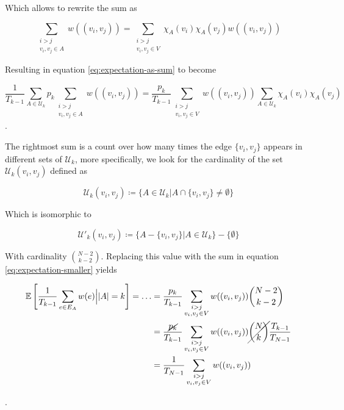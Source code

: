 \documentclass[a4paper, 10pt]{article}
\begin{document}
Which allows to rewrite the sum as

\begin{equation}
    \sum_{\substack{i>j \\ v_i,v_j \in A}}w((v_i,v_j)) = \sum_{\substack{i>j \\ v_i,v_j \in V}}\chi_A(v_i)\chi_A(v_j)w((v_i,v_j))
\end{equation}

Resulting in equation \ref{eq:expectation-as-sum} to become

\begin{equation}
    \frac{1}{T_{k-1}}\sum_{A \in \mathcal{U}_k} p_k \sum_{\substack{i>j \\ v_i,v_j \in A}}w((v_i,v_j)) = \frac{p_k}{T_{k-1}}\sum_{\substack{i>j \\ v_i,v_j \in V}}w((v_i,v_j))\sum_{A \in \mathcal{U}_k}\chi_A(v_i)\chi_A(v_j)
    \label{eq:expectation-smaller}
\end{equation}
.

The rightmost sum is a count over how many times the edge $\{v_i,v_j\}$ appears in different sets of $\mathcal{U}_k$, more specifically, we look for the cardinality of the set $\mathcal{U}_k(v_i,v_j)$ defined as

\begin{equation}
    \mathcal{U}_k(v_i, v_j) \coloneq \{A \in \mathcal{U}_k | A \cap \{v_i, v_j\} \neq \emptyset\}
\end{equation}

Which is isomorphic to

\begin{equation}
    \mathcal{U}'_k(v_i, v_j) \coloneq \{A - \{v_i, v_j\} | A \in \mathcal{U}_k\} - \{\emptyset\}
\end{equation}

With cardinality $\binom{N-2}{k-2}$. Replacing this value with the sum in equation \ref{eq:expectation-smaller} yields

\begin{align}
    \mathbb{E}\left[\frac{1}{T_{k-1}}\sum_{e \in E_A} w(e) \Big\vert |A| = k\right] = \dots &= \frac{p_k}{T_{k-1}}\sum_{\substack{i>j \\ v_i,v_j \in V}}w((v_i,v_j))\binom{N-2}{k-2} \\
    &= \frac{\cancel{p_k}}{T_{k-1}}\sum_{\substack{i>j \\ v_i,v_j \in V}}w((v_i,v_j))\cancel{\binom{N}{k}}\frac{T_{k-1}}{T_{N-1}} \\
    &= \frac{1}{T_{N-1}}\sum_{\substack{i>j \\ v_i,v_j \in V}}w((v_i,v_j))
\end{align}

.
\end{document}
